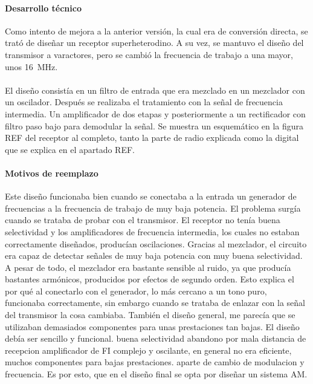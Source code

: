 \paragraph{Desarrollo técnico}
Como intento de mejora a la anterior versión, la cual era de conversión directa, se trató de diseñar un receptor superheterodino. A su vez, se mantuvo el diseño del transmisor a varactores, pero se cambió la frecuencia de trabajo a una mayor, unos \SI{16}{\mega\hertz}. 
\paragraph{}
El diseño consistía en un filtro de entrada que era mezclado en un mezclador con un oscilador. Después se realizaba el tratamiento con la señal de frecuencia intermedia. Un amplificador de dos etapas y posteriormente a un rectificador con filtro paso bajo para demodular la señal. Se muestra un esquemático en la figura REF del receptor al completo, tanto la parte de radio explicada como la digital que se explica en el apartado REF.

\paragraph{Motivos de reemplazo}
Este diseño funcionaba bien cuando se conectaba a la entrada un generador de frecuencias a la frecuencia de trabajo de muy baja potencia.
El problema surgía cuando se trataba de probar con el transmisor. 
El receptor no tenía buena selectividad y los amplificadores de frecuencia intermedia, los cuales no estaban correctamente diseñados, producían oscilaciones.
Gracias al mezclador, el circuito era capaz de detectar señales de muy baja potencia con muy buena selectividad. A pesar de todo, el mezclador era bastante sensible al ruido, ya que producía bastantes armónicos, producidos por efectos de segundo orden. Esto explica el por qué al conectarlo con el generador, lo más cercano a un tono puro, funcionaba correctamente, sin embargo cuando se trataba de enlazar con la señal del transmisor la cosa cambiaba.
También el diseño general, me parecía que se utilizaban demasiados componentes para unas prestaciones tan bajas. El diseño debía ser sencillo y funcional.
buena selectividad
abandono por mala distancia de recepcion amplificador de FI complejo y oscilante, en general no era eficiente, muchos componentes para bajas prestaciones. aparte de cambio de modulacion y frecuencia. 
Es por esto, que en el diseño final se opta por diseñar un sistema AM.
